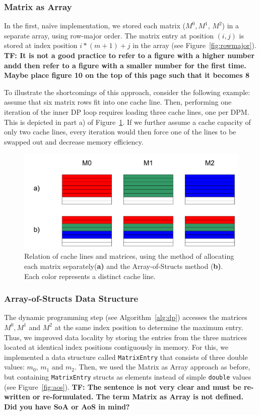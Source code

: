 \documentclass[runningheads,a4paper]{llncs}
\begin{document}
\subsubsection{Matrix as Array}
In the first, na\"ive implementation, we stored each matrix ($M^0, M^1$, $M^2$) in a separate array, using row-major order. 
The matrix entry at position $(i,j)$ is stored at index position $i*(m+1)+j$ in the array (see Figure~\ref{fig:rowmajor}).
\textbf{TF: It is not a good practice to refer to a figure with a higher number andd then refer to a figure with a smaller number for the first time. Maybe place figure 10 on the top of this page such that it becomes 8}

To illustrate the shortcomings of this approach, consider the following example: assume that six matrix rows fit into one cache line. 
Then, performing one iteration of the inner DP loop requires loading three cache lines, one per DPM. 
This is depicted in part a) of Figure~\ref{fig:cachelines}.
If we further assume a cache capacity of only two cache lines, 
every iteration would then force one of the lines to be swapped out and decrease memory efficiency.

\begin{figure}
\centering
\includegraphics[width=\textwidth]{images/cachelines.pdf}
\caption{Relation of cache lines and matrices, using the method of allocating each matrix separately(\textbf{a)} and the Array-of-Structs method (\textbf{b)}. 
Each color represents a distinct cache line.}
\label{fig:cachelines}
\end{figure}

\subsubsection{Array-of-Structs Data Structure}
The dynamic programming step (see Algorithm~\ref{alg:dp}) accesses the matrices $M^0, M^1$ and $M^2$ at the same index position to determine the maximum entry. 
Thus, we improved data locality by storing the entries from the three matrices located at identical index positions contiguously in memory. 
For this, we implemented a data structure called \texttt{MatrixEntry} that consists of three double values: \texttt{$m_0$}, \texttt{$m_1$} and \texttt{$m_2$}. 
Then, we used the Matrix as Array approach as before, but containing \texttt{MatrixEntry} structs as elements instead of simple 
\texttt{double} values (see Figure~\ref{fig:aos}). \textbf{TF: The sentence is not very clear and must be re-written or re-formulated. The term Matrix as Array is not defined. Did you have SoA or AoS in mind?}
\end{document}
